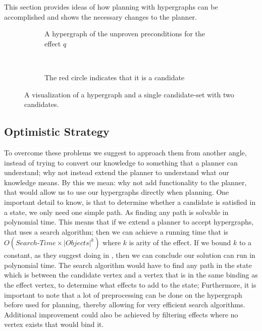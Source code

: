 \documentclass[\master/Master.tex]{subfiles}
\begin{document}
This section provides ideas of how planning with hypergraphs can be accomplished and shows the necessary changes to the planner. 


\begin{figure}
	\centering
	\begin{subfigure}{.5\textwidth}
		\centering
		  		
		\caption{\label{fig:ca:hypgraph-with-unproven} A hypergraph of the unproven preconditions for the effect $q$}
	\end{subfigure}%
	~ 
	\begin{subfigure}{.5\textwidth}
		\centering
		  
		
		
		
		\caption{\label{fig:ca:hypgraph-with-cands}The red circle indicates that it is a candidate}
	\end{subfigure}
	\caption{ A visualization of a hypergraph and a single candidate-set with two candidates. }
	\label{fig:ca:two-hypgraphs-one-cands}
\end{figure}

\subsection{Optimistic Strategy}



To overcome these problems we suggest to approach them from another angle, 
instead of trying to convert our knowledge to something that a planner can understand; 
why not instead extend the planner to understand what our knowledge means.
By this we mean: why not add functionality to the planner, that would allow us to use our hypergraphs directly when planning.
One important detail to know, is that to determine whether a candidate is satisfied in a state, we only need one simple path. 
As finding any path is solvable in polynomial time. 
This means that if we extend a planner to accept hypergraphs, that uses a search algorithm;
then we can achieve a running time that is $O(Search\texttt{-}Time \times \left| Objects \right|^k)$ where $k$ is arity of the effect. 
If we bound $k$ to a constant, as they suggest doing in \cite{Walsh2008}, then we can conclude our solution can run in polynomial time. 
The search algorithm would have to find any path in the state which is between the candidate vertex and a vertex that is in the same binding as the effect vertex, to determine what effects to add to the state; 
Furthermore, it is important to note that a lot of preprocessing can be done on the hypergraph before used for planning, thereby allowing for very efficient search algorithms. 
Additional improvement could also be achieved by filtering effects where no vertex exists that would bind it.
\end{document}
